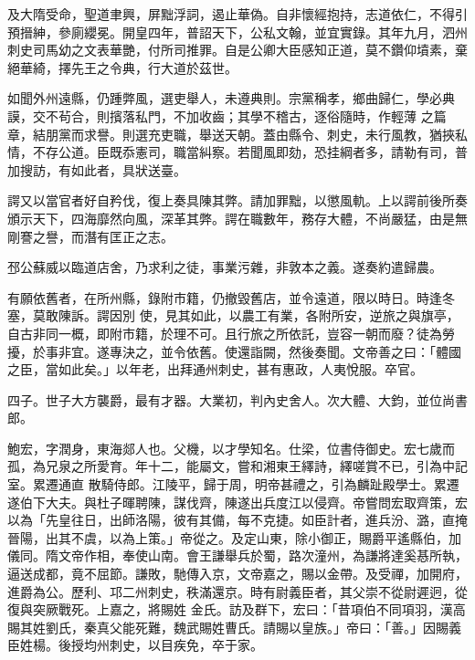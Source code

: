 \begin{pinyinscope}
 及大隋受命，聖道聿興，屏黜浮詞，遏止華偽。自非懷經抱持，志道依仁，不得引預搢紳，參廁纓冕。開皇四年，普詔天下，公私文翰，並宜實錄。其年九月，泗州刺史司馬幼之文表華艷，付所司推罪。自是公卿大臣感知正道，莫不鑽仰墳素，棄絕華綺，擇先王之令典，行大道於茲世。



 如聞外州遠縣，仍踵弊風，選吏舉人，未遵典則。宗黨稱孝，鄉曲歸仁，學必典謨，交不茍合，則擯落私門，不加收齒；其學不稽古，逐俗隨時，作輕薄
 之篇章，結朋黨而求譽。則選充吏職，舉送天朝。蓋由縣令、刺史，未行風教，猶挾私情，不存公道。臣既忝憲司，職當糾察。若聞風即劾，恐挂綱者多，請勒有司，普加搜訪，有如此者，具狀送臺。



 諤又以當官者好自矜伐，復上奏具陳其弊。請加罪黜，以懲風軌。上以諤前後所奏頒示天下，四海靡然向風，深革其弊。諤在職數年，務存大體，不尚嚴猛，由是無剛謇之譽，而潛有匡正之志。



 邳公蘇威以臨道店舍，乃求利之徒，事業污雜，非敦本之義。遂奏約遣歸農。



 有願依舊者，在所州縣，錄附市籍，仍撤毀舊店，並令遠道，限以時日。時逢冬塞，莫敢陳訴。諤因別
 使，見其如此，以農工有業，各附所安，逆旅之與旗亭，自古非同一概，即附市籍，於理不可。且行旅之所依託，豈容一朝而廢？徒為勞擾，於事非宜。遂專決之，並令依舊。使還詣闕，然後奏聞。文帝善之曰：「體國之臣，當如此矣。」以年老，出拜通州刺史，甚有惠政，人夷悅服。卒官。



 四子。世子大方襲爵，最有才器。大業初，判內史舍人。次大體、大鈞，並位尚書郎。



 鮑宏，字潤身，東海郯人也。父機，以才學知名。仕梁，位書侍御史。宏七歲而孤，為兄泉之所愛育。年十二，能屬文，嘗和湘東王繹詩，繹嗟賞不已，引為中記室。累遷通直
 散騎侍郎。江陵平，歸于周，明帝甚禮之，引為麟趾殿學士。累遷遂伯下大夫。與杜子暉聘陳，謀伐齊，陳遂出兵度江以侵齊。帝嘗問宏取齊策，宏以為「先皇往日，出師洛陽，彼有其備，每不克捷。如臣計者，進兵汾、潞，直掩晉陽，出其不虞，以為上策。」帝從之。及定山東，除小御正，賜爵平遙縣伯，加儀同。隋文帝作相，奉使山南。會王謙舉兵於蜀，路次潼州，為謙將達奚惎所執，逼送成都，竟不屈節。謙敗，馳傳入京，文帝嘉之，賜以金帶。及受禪，加開府，進爵為公。歷利、邛二州刺史，秩滿還京。時有尉義臣者，其父崇不從尉遲迥，從復與突厥戰死。上嘉之，將賜姓
 金氏。訪及群下，宏曰：「昔項伯不同項羽，漢高賜其姓劉氏，秦真父能死難，魏武賜姓曹氏。請賜以皇族。」帝曰：「善。」因賜義臣姓楊。後授均州刺史，以目疾免，卒于家。




\end{pinyinscope}
